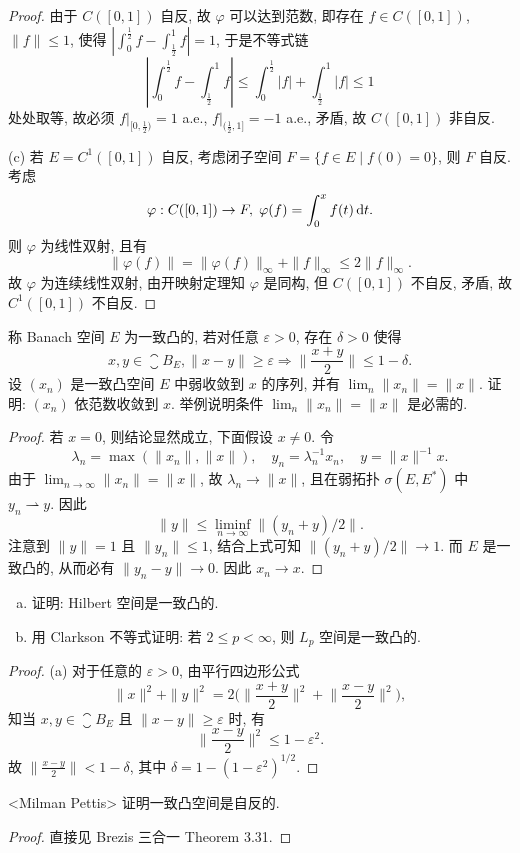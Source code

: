 \begin{proof}
    由于 $C([0,1])$ 自反, 故 $\varphi$ 可以达到范数, 即存在 $f\in C([0,1])$, $\|f\|\leq 1$, 使得
    $|\int_0^{\frac{1}{2}}f-\int_{\frac{1}{2}}^1 f|=1$, 于是不等式链
    \[\left|\int_0^{\frac{1}{2}}f-\int_{\frac{1}{2}}^1f\right|\leq\int_0^{\frac{1}{2}}|f|+\int_{\frac{1}{2}}^1 |f|\leq 1\]
    处处取等, 故必须 $f|_{[0,\frac{1}{2})}=1$ a.e., $f|_{(\frac{1}{2},1]}=-1$ a.e.,
    矛盾, 故 $C([0,1])$ 非自反.

    (c) 若 $E=C^1([0,1])$ 自反, 考虑闭子空间 $F=\{f\in E\mid f(0)=0\}$, 则 $F$ 自反.
    考虑
    \[\varphi: C([0,1])\to F,\;\varphi(f)=\int_0^x f(t)\mathop{}\!\mathrm{d} t.\]
    则 $\varphi$ 为线性双射, 且有
    \[\|\varphi(f)\|=\|\varphi(f)\|_{\infty}+\|f\|_{\infty}\leq 2\|f\|_{\infty}.\]
    故 $\varphi$ 为连续线性双射, 由开映射定理知 $\varphi$ 是同构, 但 $C([0,1])$ 不自反,
    矛盾, 故 $C^1([0,1])$ 不自反.
\end{proof}


\begin{exercise}[16]
  称 Banach 空间 $E$ 为一致凸的, 若对任意 $\varepsilon>0$, 存在 $\delta>0$ 使得
  \[x,y\in\closure{B}_E, \|x-y\|\geq\varepsilon
    \Longrightarrow\biggl\|\frac{x+y}{2}\biggr\|\leq 1-\delta.\]
  设 $(x_n)$ 是一致凸空间 $E$ 中弱收敛到 $x$ 的序列, 并有 $\lim_n\|x_n\| = \|x\|$.
  证明: $(x_n)$ 依范数收敛到 $x$. 举例说明条件 $\lim_n\|x_n\|=\|x\|$ 是必需的.
\end{exercise}

\begin{proof}
  若 $x = 0$, 则结论显然成立, 下面假设 $x\neq 0$. 令
  \[\lambda_n = \max(\|x_n\|, \|x\|),\quad y_n = \lambda_n^{-1}x_n,
    \quad y = \|x\|^{-1}x.\]
  由于 $\lim_{n\to\infty}\|x_n\| = \|x\|$,
  故 $\lambda_n\to \|x\|$, 且在弱拓扑 $\sigma(E,E^*)$ 中 $y_n\rightharpoonup y$. 因此
  \[\|y\| \leq \liminf_{n\to\infty} \|(y_n+y)/2\|.\]
  注意到 $\|y\|=1$ 且 $\|y_n\|\leq 1$, 结合上式可知 $\|(y_n+y)/2\|\to 1$.
  而 $E$ 是一致凸的, 从而必有 $\|y_n-y\|\to 0$. 因此 $x_n\to x$.
\end{proof}


\begin{exercise}
  \begin{enumerate}[(a)]
    \item 证明: Hilbert 空间是一致凸的.
    \item 用 Clarkson 不等式证明: 若 $2\leq p<\infty$, 则 $L_p$ 空间是一致凸的.
  \end{enumerate}
\end{exercise}

\begin{proof}
  (a) 对于任意的 $\varepsilon>0$, 由平行四边形公式
  \[\|x\|^2 + \|y\|^2 = 2\biggl(\biggl\|\frac{x+y}{2}\biggr\|^2
    + \biggl\|\frac{x-y}{2}\biggr\|^2\biggr),\]
  知当 $x,y\in\closure{B}_E$ 且 $\|x-y\|\geq\varepsilon$ 时, 有
  \[\biggl\|\frac{x-y}{2}\biggr\|^2 \leq 1-\varepsilon^2.\]
  故 $\bigl\|\frac{x-y}{2}\bigr\| < 1-\delta$, 其中 $\delta = 1-(1-\varepsilon^2)^{1/2}$.
\end{proof}


\begin{exercise}<Milman Pettis>
  证明一致凸空间是自反的.
\end{exercise}

\begin{proof}
  直接见 Brezis 三合一 Theorem 3.31.
\end{proof}